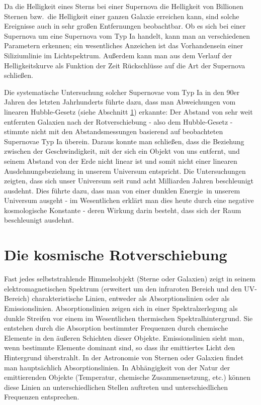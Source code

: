 Da die Helligkeit eines Sterns bei einer Supernova die Helligkeit von Billionen Sternen bzw.\
die Helligkeit einer ganzen Galaxie erreichen kann, sind solche Ereignisse auch 
in sehr gro\ss en Entfernungen beobachtbar. Ob es sich bei
einer Supernova um eine Supernova vom Typ Ia handelt, kann man an verschiedenen
Parametern erkennen; ein wesentliches Anzeichen ist das Vorhandensein einer Siliziumlinie
im Lichtspektrum. Au\ss erdem kann man aus dem Verlauf der Helligkeitskurve als Funktion
der Zeit R\"uckschl\"usse auf die Art der Supernova schlie\ss en.  

Die systematische Untersuchung solcher Supernovae vom Typ Ia in den 90er Jahren des letzten
Jahrhunderts f\"uhrte dazu, dass man Abweichungen vom linearen Hubble-Gesetz (siehe 
Abschnitt \ref{sec_Hubble}) erkannte: Der Abstand von sehr weit entfernten Galaxien nach
der Rotverschiebung - also dem Hubble-Gesetz - stimmte nicht mit den Abstandsmessungen
basierend auf beobachteten Supernovae Typ Ia \"uberein. Daraus konnte man schlie\ss en, dass
die Beziehung zwischen der Geschwindigkeit, mit der sich ein Objekt von uns entfernt, und
seinem Abstand von der Erde nicht linear ist und somit nicht einer linearen Ausdehnungsbeziehung
in unserem Universum entspricht. Die Untersuchungen zeigten, dass sich unser Universum seit rund
acht Milliarden Jahren beschleunigt ausdehnt. Dies f\"uhrte dazu, dass man von einer
\glqq dunklen Energie\grqq\ in unserem\index{Dunkle Energie} 
Universum ausgeht - im Wesentlichen erkl\"art man
dies heute durch eine negative kosmologische Konstante - deren Wirkung darin besteht, 
dass sich der Raum beschleunigt ausdehnt.  

\section{Die kosmische Rotverschiebung}
\label{sec_Hubble}

Fast jedes selbststrahlende Himmelsobjekt (Sterne oder Galaxien) zeigt in seinem elektromagnetischen
Spektrum (erweitert um den infraroten Bereich und den UV-Bereich) charakteristische Linien,
entweder als Absorptionslinien oder als Emissionslinien. Absorptionslinien zeigen sich in einer
Spektralzerlegung als dunkle Streifen vor einem im Wesentlichen thermischen Spektralhintergrund.
Sie entstehen durch die Absorption bestimmter Frequenzen durch chemische Elemente in den \"au\ss eren 
Schichten dieser Objekte. Emissionslinien sieht man, wenn bestimmte Elemente dominant
sind, so dass ihr emittiertes Licht den Hintergrund \"uberstrahlt. In der Astronomie von Sternen oder
Galaxien findet man haupts\"achlich Absorptionslinien. In Abh\"angigkeit von der Natur der
emittierenden Objekte (Temperatur, chemische Zusammensetzung, etc.) k\"onnen diese Linien
an unterschiedlichen Stellen auftreten und unterschiedlichen Frequenzen entsprechen.

